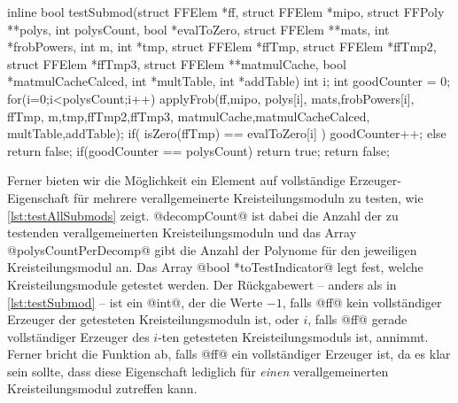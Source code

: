 \begin{ccode}[caption={Aus \url{../Sage/enumeratePCNs.c}},
  firstnumber=912, label=lst:testSubmod]
inline bool testSubmod(struct FFElem *ff, struct FFElem *mipo, 
        struct FFPoly **polys,
        int polysCount, bool *evalToZero, 
        struct FFElem **mats, int *frobPowers,
        int m, int *tmp, 
        struct FFElem *ffTmp, struct FFElem *ffTmp2, struct FFElem *ffTmp3, 
        struct FFElem **matmulCache, bool *matmulCacheCalced,
        int *multTable, int *addTable){
    int i;
    int goodCounter = 0;
    for(i=0;i<polysCount;i++){
        applyFrob(ff,mipo,
                polys[i],
                mats,frobPowers[i], ffTmp,
                m,tmp,ffTmp2,ffTmp3,
                matmulCache,matmulCacheCalced,
                multTable,addTable);
        if( isZero(ffTmp) == evalToZero[i] ){
            goodCounter++;
        }else{
            return false;
        }
    }
    if(goodCounter == polysCount){
        return true;
    }
    return false;
}
\end{ccode}


Ferner bieten wir die Möglichkeit ein Element auf vollständige
Erzeuger-Eigenschaft für mehrere verallgemeinerte Kreisteilungsmoduln zu
testen, wie \autoref{lst:testAllSubmods} zeigt. @decompCount@ ist dabei die
Anzahl der zu testenden verallgemeinerten Kreisteilungsmoduln und das Array
@polysCountPerDecomp@ gibt die Anzahl der Polynome für den jeweiligen
Kreisteilungsmodul an. Das Array @bool *toTestIndicator@ legt fest, welche
Kreisteilungsmodule getestet werden. Der Rückgabewert -- anders als in 
\autoref{lst:testSubmod} -- ist ein @int@, der die Werte $-1$, falls @ff@ kein
vollständiger Erzeuger der getesteten Kreisteilungsmoduln ist, oder $i$, falls
@ff@ gerade vollständiger Erzeuger des $i$-ten getesteten Kreisteilungsmoduls
ist, annimmt. Ferner bricht die Funktion ab, falls @ff@ ein vollständiger
Erzeuger ist, da es klar sein sollte, dass diese Eigenschaft lediglich für
\emph{einen} verallgemeinerten Kreisteilungsmodul zutreffen kann.

